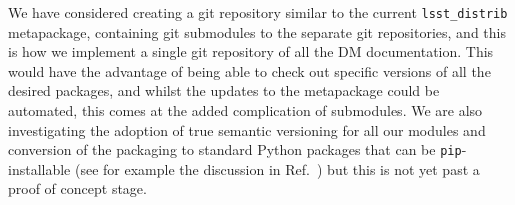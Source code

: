 We have considered creating a git repository similar to the current \texttt{lsst\_distrib} metapackage, containing git submodules to the separate git repositories, and this is how we implement a single git repository of all the DM documentation.
This would have the advantage of being able to check out specific versions of all the desired packages, and whilst the updates to the metapackage could be automated, this comes at the added complication of submodules.
We are also investigating the adoption of true semantic versioning\cite{semver} for all our modules and conversion of the packaging to standard Python packages that can be \texttt{pip}-installable (see for example the discussion in Ref.~) but this is not yet past a proof of concept stage.

